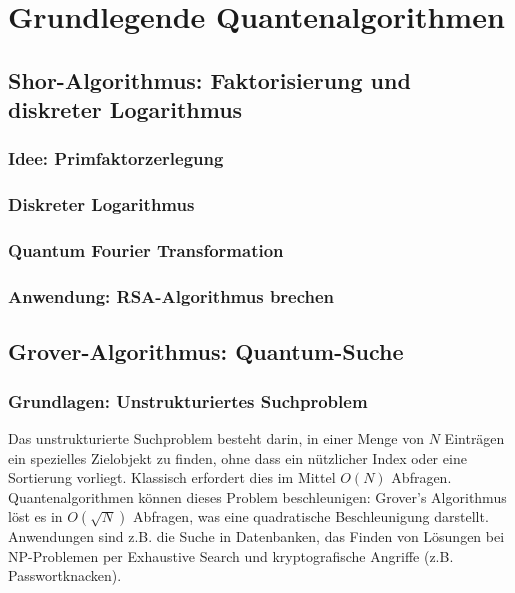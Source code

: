 \chapter{Grundlegende Quantenalgorithmen}
\label{basic_algorithms} %




\section{Shor-Algorithmus: Faktorisierung und diskreter Logarithmus}
\subsection{Idee: Primfaktorzerlegung}
\subsection{Diskreter Logarithmus}
\subsection{Quantum Fourier Transformation}
\subsection{Anwendung: RSA-Algorithmus brechen}

\section{Grover-Algorithmus: Quantum-Suche}
\subsection{Grundlagen: Unstrukturiertes Suchproblem}

Das unstrukturierte Suchproblem besteht darin, in einer Menge von $N$ Einträgen ein spezielles Zielobjekt zu finden, ohne dass ein nützlicher Index oder eine Sortierung vorliegt. Klassisch erfordert dies im Mittel $O(N)$ Abfragen.\\
Quantenalgorithmen können dieses Problem beschleunigen: Grover’s Algorithmus löst es in $O(\sqrt{N})$ Abfragen, was eine quadratische Beschleunigung darstellt.\\
Anwendungen sind z.B. die Suche in Datenbanken, das Finden von Lösungen bei NP-Problemen per Exhaustive Search und kryptografische Angriffe (z.B. Passwortknacken).

